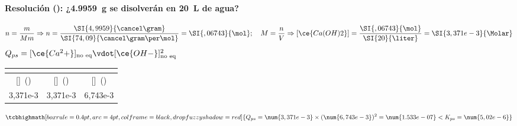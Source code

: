 \begin{frame}
	\frametitle{\ejerciciocmd}
	\framesubtitle{Resolución (): ¿\SI{4,9959}{\gram} se disolverán en \SI{20}{\liter} de agua?}
	$$
		n = \frac{m}{Mm}\Rightarrow n = \frac{\SI{4,9959}{\cancel\gram}}{\SI{74,09}{\cancel\gram\per\mol}} = \SI{,06743}{\mol};\quad M = \frac{n}{V}\Rightarrow [\ce{Ca(OH)2}] = \frac{\SI{,06743}{\mol}}{\SI{20}{\liter}} = \SI{3,371e-3}{\Molar}
	$$
	 $Q_{ps} = [\ce{Ca^2+}]_{\text{no eq}}\vdot[\ce{OH-}]^2_{\text{no eq}}$
	\begin{center}
		\begin{tabular}{SSS}
				\\
			\midrule
			{[]~(\si{\Molar})}	&	{[]~(\si{\Molar})}	&	{[]~(\si{\Molar})}	\\
			,371e-3						&	3,371e-3						&	6,743e-3
		\end{tabular}
	\end{center}
	$$
		\tcbhighmath[boxrule=0.4pt,arc=4pt,colframe=black,drop fuzzy shadow=red]{Q_{ps} = \num{3,371e-3}\times (\num{6,743e-3})^2 = \num{1.533e-07} < K_{ps} = \num{5,02e-6}}
	$$
	\begin{center}
	\end{center}
\end{frame}

